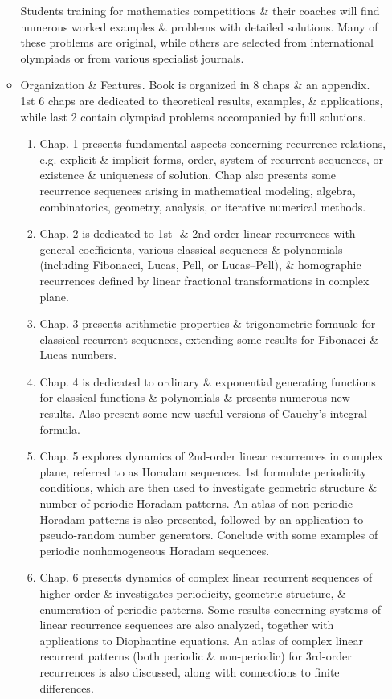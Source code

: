 \documentclass{article}
\begin{document}
\begin{itemize}
\begin{itemize}
		Students training for mathematics competitions \& their coaches will find numerous worked examples \& problems with detailed solutions. Many of these problems are original, while others are selected from international olympiads or from various specialist journals.
		\item {\sf Organization \& Features.} Book is organized in 8 chaps \& an appendix. 1st 6 chaps are dedicated to theoretical results, examples, \& applications, while last 2 contain olympiad problems accompanied by full solutions.
		\begin{enumerate}
			\item Chap. 1 presents fundamental aspects concerning recurrence relations, e.g. explicit \& implicit forms, order, system of recurrent sequences, or existence \& uniqueness of solution. Chap also presents some recurrence sequences arising in mathematical modeling, algebra, combinatorics, geometry, analysis, or iterative numerical methods.
			\item Chap. 2 is dedicated to 1st- \& 2nd-order linear recurrences with general coefficients, various classical sequences \& polynomials (including Fibonacci, Lucas, Pell, or Lucas--Pell), \& homographic recurrences defined by linear fractional transformations in complex plane.
			\item Chap. 3 presents arithmetic properties \& trigonometric formuale for classical recurrent sequences, extending some results for Fibonacci \& Lucas numbers.
			\item Chap. 4 is dedicated to ordinary \& exponential generating functions for classical functions \& polynomials \& presents numerous new results. Also present some new useful versions of Cauchy's integral formula.
			\item Chap. 5 explores dynamics of 2nd-order linear recurrences in complex plane, referred to as Horadam sequences. 1st formulate periodicity conditions, which are then used to investigate geometric structure \& number of periodic Horadam patterns. An atlas of non-periodic Horadam patterns is also presented, followed by an application to pseudo-random number generators. Conclude with some examples of periodic nonhomogeneous Horadam sequences.
			\item Chap. 6 presents dynamics of complex linear recurrent sequences of higher order \& investigates periodicity, geometric structure, \& enumeration of periodic patterns. Some results concerning systems of linear recurrence sequences are also analyzed, together with applications to Diophantine equations. An atlas of complex linear recurrent patterns (both periodic \& non-periodic) for 3rd-order recurrences is also discussed, along with connections to finite differences.

\end{enumerate}
\end{itemize}
\end{itemize}
\end{document}
